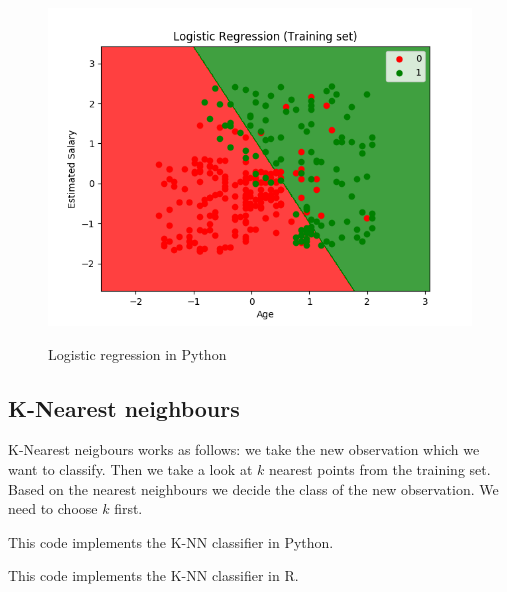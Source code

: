 \documentclass[runningheads,a4paper]{llncs}
\begin{document}
\begin{figure}[H]
\centering
\begin{center}
\includegraphics[scale=0.8]{pics/logistic}
\label{uloha1:pic1}
\caption{Logistic regression in Python} 
\end{center}
\end{figure}

\subsection{K-Nearest neighbours} 

K-Nearest neigbours works as follows: we take the new observation which we want to classify. Then we take a look at $k$ nearest points from the training set. Based on the nearest neighbours we decide the class of the new observation. We need to choose $k$ first. 

This code implements the K-NN classifier in Python.
 


This code implements the K-NN classifier in R.
 
\end{document}
